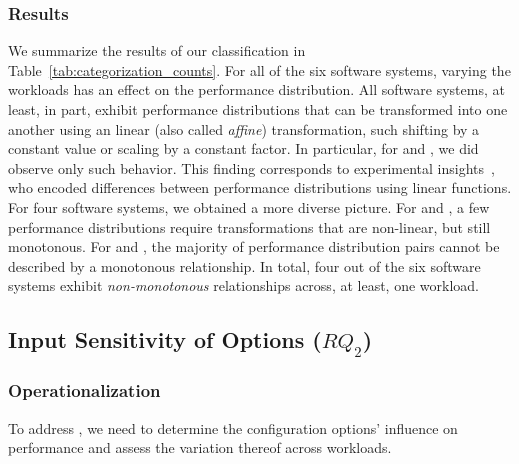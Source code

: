 {\subsubsection{Results}
We summarize the results of our classification in Table~\ref{tab:categorization_counts}. For all of the six software systems, varying the workloads has an effect on the performance distribution. All software systems, at least, in part, exhibit performance distributions that can be transformed into one another using an linear (also called \textit{affine}) transformation, such shifting by a constant value or scaling by a constant factor. In particular, for \jumper and \jadx, we did  observe only such behavior. This finding corresponds to experimental insights~\citeauthor{jamishidi_transfer_2017}, who encoded differences between performance distributions using linear functions. For four software systems, we obtained a more diverse picture. For \kanzi and \batik, a few performance distributions require transformations that are non-linear, but still monotonous. For \dconvert and \htwo, the majority of performance distribution pairs cannot be described by a monotonous relationship. In total, four out of the six software systems exhibit \emph{non-monotonous} relationships across, at least, one workload.
\vspace{2mm}

\subsection{Input Sensitivity of Options ($RQ_2$)}\label{sec:rq2}

\subsubsection{Operationalization}
To address , we need to determine the configuration options’ influence on performance and assess the variation thereof across workloads. 

}
